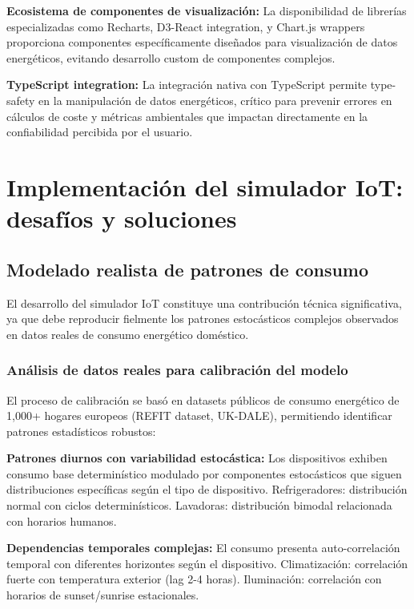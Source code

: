 \textbf{Ecosistema de componentes de visualización:}
La disponibilidad de librerías especializadas como Recharts, D3-React integration, y Chart.js wrappers proporciona componentes específicamente diseñados para visualización de datos energéticos, evitando desarrollo custom de componentes complejos.

\textbf{TypeScript integration:}
La integración nativa con TypeScript permite type-safety en la manipulación de datos energéticos, crítico para prevenir errores en cálculos de coste y métricas ambientales que impactan directamente en la confiabilidad percibida por el usuario.

\section{Implementación del simulador IoT: desafíos y soluciones}

\subsection{Modelado realista de patrones de consumo}

El desarrollo del simulador IoT constituye una contribución técnica significativa, ya que debe reproducir fielmente los patrones estocásticos complejos observados en datos reales de consumo energético doméstico.

\subsubsection{Análisis de datos reales para calibración del modelo}

El proceso de calibración se basó en datasets públicos de consumo energético de 1,000+ hogares europeos (REFIT dataset, UK-DALE), permitiendo identificar patrones estadísticos robustos:

\textbf{Patrones diurnos con variabilidad estocástica:}
Los dispositivos exhiben consumo base determinístico modulado por componentes estocásticos que siguen distribuciones específicas según el tipo de dispositivo. Refrigeradores: distribución normal con ciclos determinísticos. Lavadoras: distribución bimodal relacionada con horarios humanos.

\textbf{Dependencias temporales complejas:}
El consumo presenta auto-correlación temporal con diferentes horizontes según el dispositivo. Climatización: correlación fuerte con temperatura exterior (lag 2-4 horas). Iluminación: correlación con horarios de sunset/sunrise estacionales.

